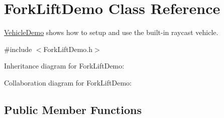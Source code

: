 \hypertarget{class_fork_lift_demo}{\section{Fork\+Lift\+Demo Class Reference}
\label{class_fork_lift_demo}
}


\hyperlink{class_vehicle_demo}{Vehicle\+Demo} shows how to setup and use the built-\/in raycast vehicle.  




{\ttfamily \#include $<$Fork\+Lift\+Demo.\+h$>$}



Inheritance diagram for Fork\+Lift\+Demo\+:


Collaboration diagram for Fork\+Lift\+Demo\+:
\subsection*{Public Member Functions}
